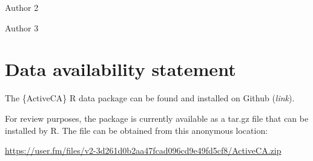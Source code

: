\documentclass[Royal,times,sageh]{sagej}
\begin{document}
Author 2

Author 3

\section{Data availability statement}\label{data-availability-statement}

The \{ActiveCA\} R data package can be found and installed on Github
(\emph{link}).

For review purposes, the package is currently available as a tar.gz file
that can be installed by R. The file can be obtained from this anonymous
location:

\url{https://user.fm/files/v2-3d261d0b2aa47fcad096cd9e49fd5cf8/ActiveCA.zip}



\end{document}
